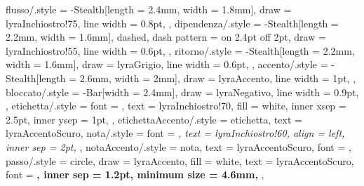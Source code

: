{  flusso/.style = {
    -{Stealth[length = 2.4mm, width = 1.8mm]},
    draw = lyraInchiostro!75, line width = 0.8pt,
  },
  dipendenza/.style = {
    -{Stealth[length = 2.2mm, width = 1.6mm]}, dashed, dash pattern = on 2.4pt off 2pt,
    draw = lyraInchiostro!55, line width = 0.6pt,
  },
  ritorno/.style = {
    -{Stealth[length = 2.2mm, width = 1.6mm]},
    draw = lyraGrigio, line width = 0.6pt,
  },
  accento/.style = {
    -{Stealth[length = 2.6mm, width = 2mm]},
    draw = lyraAccento, line width = 1pt,
  },
  bloccato/.style = {
    -{Bar[width = 2.4mm]}, draw = lyraNegativo, line width = 0.9pt,
  },
  etichetta/.style = {
    font = \sffamily\scriptsize, text = lyraInchiostro!70,
    fill = white, inner xsep = 2.5pt, inner ysep = 1pt,
  },
  etichettaAccento/.style = {etichetta, text = lyraAccentoScuro},
  nota/.style = {
    font = \sffamily\scriptsize\itshape, text = lyraInchiostro!60,
    align = left, inner sep = 2pt,
  },
  notaAccento/.style = {nota, text = lyraAccentoScuro, font = \sffamily\scriptsize},
  passo/.style = {
    circle, draw = lyraAccento, fill = white, text = lyraAccentoScuro,
    font = \sffamily\scriptsize\bfseries, inner sep = 1.2pt,
    minimum size = 4.6mm,
  },
}

\newcommand{\lyrastrato}[3][]{%
  \stepcounter{lyrastratoN}%
  \begin{scope}[on background layer]
    \node[strato, fit = #2, #1] (cornice\thelyrastratoN) {};
    \node[stratoTitolo, anchor = south west]
      at ([shift={(1pt,1.5pt)}]cornice\thelyrastratoN.north west) {#3};
  \end{scope}}

\newcommand{\lyralegenda}[1]{%
  \begin{tikzpicture}[baseline]
    \matrix[matrix of nodes, nodes = {anchor = west, font = \sffamily\scriptsize},
            column sep = 3mm, row sep = 0.6mm] {#1\\};
  \end{tikzpicture}}

